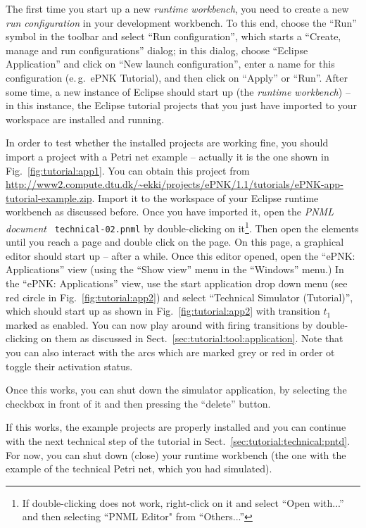 The first time you start up a new \emph{runtime workbench}, you need to create
a new \emph{run configuration} in your development workbench. To this
end, choose the ``Run'' symbol in the toolbar and select ``Run configuration'',
which starts a ``Create, manage and run configurations'' dialog; in this
dialog, choose ``Eclipse Application'' and click on ``New launch
configuration'', enter a name for this configuration (e.\,g.\ ePNK Tutorial),
and then click on ``Apply'' or ``Run''. After some time, a new instance of
Eclipse should start up (the \emph{runtime workbench}) -- in this instance, the
Eclipse tutorial projects that you just have imported to your workspace are
installed and running.

In order to test whether the installed projects are working fine, you should
import a project with a Petri net example -- actually it is the one shown
in Fig.~\ref{fig:tutorial:app1}. You can obtain this project from
\url{http://www2.compute.dtu.dk/~ekki/projects/ePNK/1.1/tutorials/ePNK-app-tutorial-example.zip}.
Import it to the workspace of your Eclipse runtime workbench as discussed
before. Once you have imported it, open the \emph{PNML document} {\tt
technical-02.pnml} by double-clicking on it\footnote
  {If double-clicking does not work, right-click on it and select ``Open
  with...'' and then selecting ``PNML Editor" from ``Others...''}.
Then open the elements until you reach a page and double click on the page.
On this page, a graphical editor should start up -- after a while. Once this
editor opened, open the ``ePNK: Applications'' view (using the ``Show view''
menu in the ``Windows'' menu.) In the ``ePNK: Applications'' view, use the
start application drop down menu (see red circle in
Fig.~\ref{fig:tutorial:app2}) and select ``Technical Simulator (Tutorial)'',
which should start up as shown in Fig.~\ref{fig:tutorial:app2} with
transition $t_1$ marked as enabled. You can now play around with firing
transitions by double-clicking on them as discussed in
Sect.~\ref{sec:tutorial:tool:application}. Note that you can also interact
with the arcs which are marked grey or red in order ot toggle their activation
status.

Once this works, you can shut down the simulator application, by selecting the
checkbox in front of it and then pressing the ``delete'' button.

If this works, the example projects are properly installed and you can continue
with the next technical step of the tutorial in
Sect.~\ref{sec:tutorial:technical:pntd}. For now, you can shut down (close) your
runtime workbench (the one with the example of the technical Petri net, which
you had simulated).

